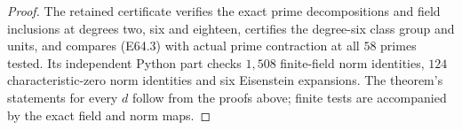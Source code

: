 \begin{proof}
The retained certificate verifies the exact prime decompositions
and field inclusions at degrees two, six and eighteen, certifies
the degree-six class group and units, and compares (E64.3) with
actual prime contraction at all $58$ primes tested.
Its independent Python part checks $1{,}508$ finite-field norm
identities, $124$ characteristic-zero norm identities and
six Eisenstein expansions. The theorem's statements for every
$d$ follow from the proofs above; finite tests are accompanied
by the exact field and norm maps.
\end{proof}
